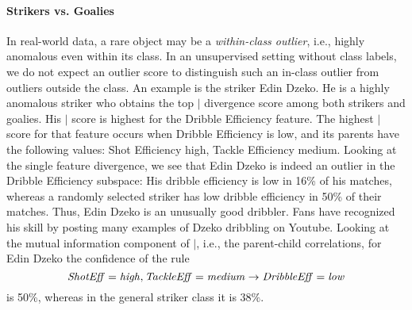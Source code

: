 {							\paragraph{Strikers vs. Goalies} 
							In real-world data, a rare object may be a {\em within-class outlier}, i.e., highly anomalous even within its class. In an unsupervised setting without class labels, we do not expect an outlier score to distinguish such an in-class outlier from outliers outside the class. 
							An example is the striker Edin Dzeko. He is a highly anomalous striker who obtains 
							the top $\mid$ divergence score among both strikers and goalies. His $\mid$ score is highest for the Dribble Efficiency feature. The highest $\mid$ score for that feature occurs when Dribble Efficiency is low, and its parents have the following values: Shot Efficiency high, Tackle Efficiency medium. Looking at the single feature divergence, 
							we see that Edin Dzeko is indeed an outlier in the Dribble Efficiency subspace: His dribble efficiency is low in 16\% of his matches, whereas a randomly selected striker has low dribble efficiency in 50\% of their matches. Thus, Edin Dzeko is an unusually good dribbler. Fans have recognized his skill by posting many examples of Dzeko dribbling on Youtube. Looking at the mutual information component of $\mid$, i.e., the parent-child correlations, for Edin Dzeko the confidence of the rule 
							$$\it{ShotEff} = \it{high}, \it{TackleEff} = \it{medium}\rightarrow \it{DribbleEff} = \it{low}$$ is 50\%, whereas in the general striker class it is $38\%$.
							
}
